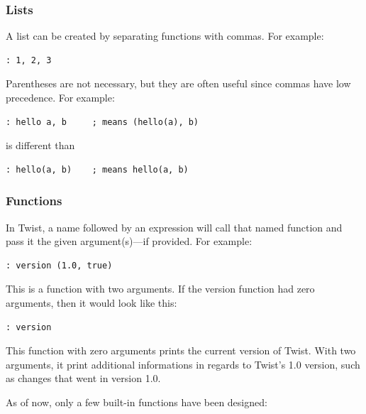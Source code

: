 \subsubsection{Lists}
\label{sec:lists}

A list can be created by separating functions with commas. For example:

\begin{verbatim}
: 1, 2, 3
\end{verbatim}

Parentheses are not necessary, but they are often useful since commas have low precedence. For example:

\begin{verbatim}
: hello a, b     ; means (hello(a), b)
\end{verbatim}

is different than

\begin{verbatim}
: hello(a, b)    ; means hello(a, b)
\end{verbatim}

\subsubsection{Functions}
\label{sec:functions}

In Twist, a name followed by an expression will call that named function and pass it the given argument(s)---if provided. For example:

\begin{verbatim}
: version (1.0, true)
\end{verbatim}

This is a function with two arguments. If the version function had zero arguments, then it would look like this:

\begin{verbatim}
: version
\end{verbatim}

This function with zero arguments prints the current version of Twist. With two arguments, it print additional informations in regards to Twist's 1.0 version, such as changes that went in version 1.0. 

As of now, only a few built-in functions have been designed:

